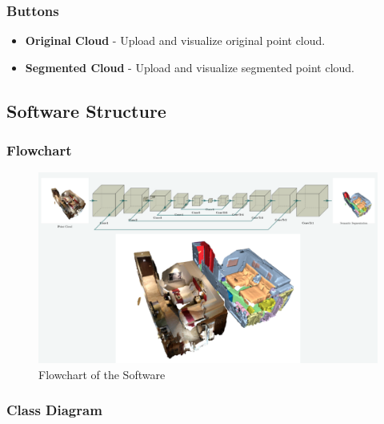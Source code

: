 \documentclass[11pt, a4paper,oneside,chapterprefix=false]{scrbook}
\begin{document}
\subsubsection{Buttons}

\begin{itemize}
	\item \textbf{Original Cloud} - Upload and visualize original point cloud.
	\item \textbf{Segmented Cloud} - Upload and visualize segmented point cloud.
\end{itemize}

\subsection{Software Structure}

\subsubsection{Flowchart}

\begin{minipage}{\textwidth}
	\begin{figure}[H]
		\centering
		\includegraphics*[width=1.0\textwidth]{figures/Minkowski Engine.png}
		\caption{Flowchart of the Software}
		\label{fig:flowchart}
	\end{figure}
\end{minipage}

\subsubsection{Class Diagram}
\end{document}

